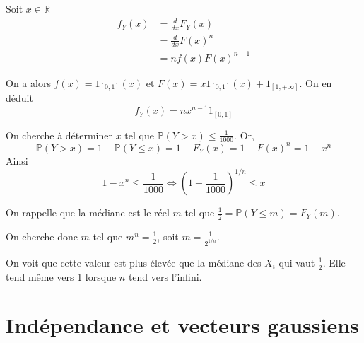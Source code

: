 \label{II-answer-crue2}
Soit \(x\in \mathbb{R}\) \begin{align*}
f_Y(x) &= \frac{d}{d x} F_Y(x)\\
       &= \frac{d}{d x} F(x)^n\\
       &= nf(x)F(x)^{n-1}
\end{align*}

\label{II-answer-crue3}
On a alors \(f(x) = 1_{[0,1]}(x)\) et
\(F(x) = x 1_{[0,1]}(x) + 1_{[1,+\infty]}\). On en déduit
\[ f_Y(x) = n x^{n-1}1_{[0,1]} \]

\label{II-answer-crue4}
On cherche à déterminer \(x\) tel que
\(\mathbb{P}(Y > x) \leq \frac{1}{1000}\). Or,
\[ \mathbb{P}(Y > x) = 1-\mathbb{P}(Y \leq x) = 1 - F_Y(x) = 1 - F(x)^n = 1-x^n \]
Ainsi
\[ 1-x^n \leq \frac{1}{1000} \Leftrightarrow (1-\frac{1}{1000})^{1/n} \leq x \]

\label{II-answer-crue5}
On rappelle que la médiane est le réel \(m\) tel que
\(\frac{1}{2} = \mathbb{P}(Y \leq m) = F_Y(m)\).

On cherche donc \(m\) tel que \(m^n = \frac{1}{2}\), soit
\(m = \frac{1}{2^{1/n}}\).

On voit que cette valeur est plus élevée que la médiane des \(X_i\) qui
vaut \(\frac{1}{2}\). Elle tend même vers 1 lorsque \(n\) tend vers
l'infini.

\section{Indépendance et vecteurs
gaussiens}\label{II-induxe9pendance-et-vecteurs-gaussiens-1}

